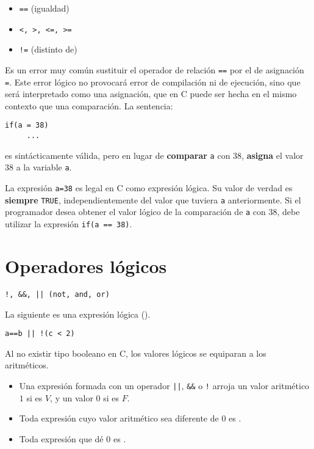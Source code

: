 \begin{itemize}
\item \lstinline{==} (igualdad)
\item \lstinline{<, >, <=, >=}
\item \lstinline{!=} (distinto de)
\end{itemize}
Es un error muy común sustituir el operador de relación \lstinline{==} por el de asignación \lstinline{=}. Este error lógico no provocará error de compilación ni de ejecución, sino que será interpretado como una asignación, que en C puede ser hecha en el mismo contexto que una comparación. La sentencia:
\begin{lstlisting}
if(a = 38)
     ...
\end{lstlisting}     
es sintácticamente válida, pero en lugar de \textbf{comparar} \lstinline{a} con 38, \textbf{asigna} el valor 38 a la variable \lstinline{a}. 

La expresión \lstinline{a=38} es legal en C como expresión lógica. Su valor de verdad es \textbf{siempre} \lstinline{TRUE}, independientemente del valor que tuviera \lstinline{a} anteriormente. Si el programador desea obtener el valor lógico de la comparación de \lstinline{a} con 38, debe utilizar la expresión \lstinline{if(a == 38)}.



\section{Operadores lógicos}
\begin{lstlisting}
!, &&, || (not, and, or)	
\end{lstlisting}

\begin{ejemplo}
La siguiente es una expresión lógica ().
\begin{lstlisting}
a==b || !(c < 2)    
\end{lstlisting}
\end{ejemplo}

Al no existir tipo booleano en C, los valores lógicos se equiparan a los aritméticos. 
\begin{itemize}
	\item Una expresión formada con un operador \lstinline{||}, \lstinline{&&} o \lstinline{!} arroja un valor aritmético $1$ si es $V$, y un valor $0$ si es $F$. 
	\item Toda expresión cuyo valor aritmético sea diferente de $0$ es . 
	\item Toda expresión que dé $0$ es .
\end{itemize}

